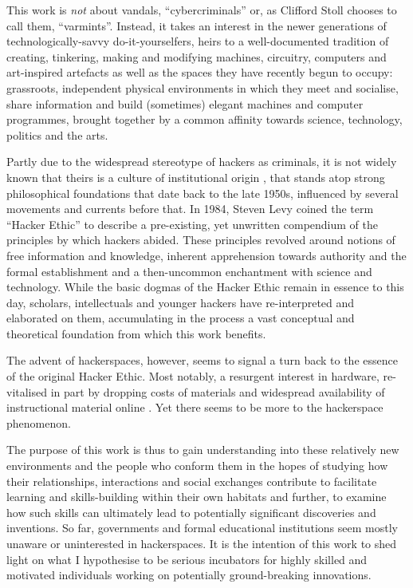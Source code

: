 This work is \emph{not} about vandals, ``cybercriminals'' or, as Clifford Stoll \citeyearpar{stoll89} chooses to call them, ``varmints''. Instead, it takes an interest in the newer generations of technologically-savvy do-it-yourselfers, heirs to a well-documented tradition of creating, tinkering, making and modifying machines, circuitry, computers and art-inspired artefacts as well as the spaces they have recently begun to occupy: grassroots, independent physical environments in which they meet and socialise, share information and build (sometimes) elegant machines and computer programmes, brought together by a common affinity towards science, technology, politics and the arts.

Partly due to the widespread stereotype of hackers as criminals, it is not widely known that theirs is a culture of institutional origin \citep{thomas02}, that stands atop strong philosophical foundations that date back to the late 1950s, influenced by several movements and currents before that. In 1984, Steven Levy coined the term ``Hacker Ethic'' to describe a pre-existing, yet unwritten compendium of the principles by which hackers abided. These principles revolved around notions of free information and knowledge, inherent apprehension towards authority and the formal establishment and a then-uncommon enchantment with science and technology. While the basic dogmas of the Hacker Ethic remain in essence to this day, scholars, intellectuals and younger hackers have re-interpreted and elaborated on them, accumulating in the process a vast conceptual and theoretical foundation from which this work benefits.

The advent of hackerspaces, however, seems to signal a turn back to the essence of the original Hacker Ethic. Most notably, a resurgent interest in hardware, re-vitalised in part by dropping costs of materials and widespread availability of instructional material online \citep{Kuznetsov}. Yet there seems to be more to the hackerspace phenomenon. 

The purpose of this work is thus to gain understanding into these relatively new environments and the people who conform them in the hopes of studying how their relationships, interactions and social exchanges contribute to facilitate learning and skills-building within their own habitats and further, to examine how such skills can ultimately lead to potentially significant discoveries and inventions. So far, governments and formal educational institutions seem mostly unaware or uninterested in hackerspaces. It is the intention of this work to shed light on what I hypothesise to be serious incubators for highly skilled and motivated individuals working on potentially ground-breaking innovations.

